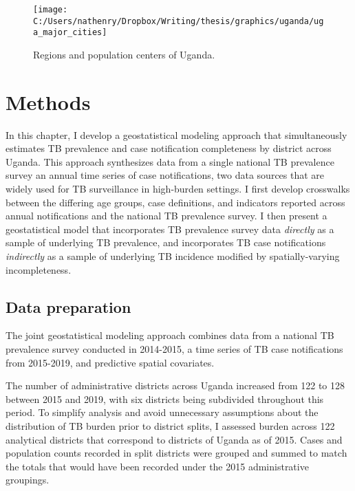 \documentclass[
]{article}
\begin{document}
\begin{figure}[!ht]

{\centering \texttt{[image: C:/Users/nathenry/Dropbox/Writing/thesis/graphics/uganda/uga\_major\_cities]} 

}

\caption{Regions and population centers of Uganda.}\label{fig:uga-map}
\end{figure}

\hypertarget{methods}{%
\section{Methods}\label{methods}}

In this chapter, I develop a geostatistical modeling approach that simultaneously estimates TB prevalence and case notification completeness by district across Uganda. This approach synthesizes data from a single national TB prevalence survey an annual time series of case notifications, two data sources that are widely used for TB surveillance in high-burden settings. I first develop crosswalks between the differing age groups, case definitions, and indicators reported across annual notifications and the national TB prevalence survey. I then present a geostatistical model that incorporates TB prevalence survey data \emph{directly} as a sample of underlying TB prevalence, and incorporates TB case notifications \emph{indirectly} as a sample of underlying TB incidence modified by spatially-varying incompleteness.

\hypertarget{data-preparation}{%
\subsection{Data preparation}\label{data-preparation}}

The joint geostatistical modeling approach combines data from a national TB prevalence survey conducted in 2014-2015, a time series of TB case notifications from 2015-2019, and predictive spatial covariates.

The number of administrative districts across Uganda increased from 122 to 128 between 2015 and 2019, with six districts being subdivided throughout this period. To simplify analysis and avoid unnecessary assumptions about the distribution of TB burden prior to district splits, I assessed burden across 122 analytical districts that correspond to districts of Uganda as of 2015. Cases and population counts recorded in split districts were grouped and summed to match the totals that would have been recorded under the 2015 administrative groupings.
\end{document}

